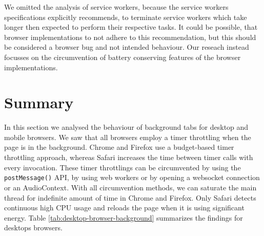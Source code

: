 \documentclass[
	ruledheaders=section,%
	class=report,%
	thesis={type=bachelor},%
	accentcolor=9c,%
	custommargins=true,%
	marginpar=false,%
	parskip=half-,%
	fontsize=11pt,%
]{tudapub}
\begin{document}
  We omitted the analysis of service workers, because the service workers specifications explicitly recommends, to terminate service workers which take longer then expected to perform their respective tasks. It could be possible, that browser implementations to not adhere to this recommendation, but this should be considered a browser bug and not intended behaviour. Our reseach instead focusses on the circumvention of battery conserving features of the browser implementations.


  
  \section{Summary}

  In this section we analysed the behaviour of background tabs for desktop and mobile browsers. We saw that all browsers employ a timer throttling when the page is in the background. Chrome and Firefox use a budget-based timer throttling approach, whereas Safari increases the time between timer calls with every invocation. These timer throttlings can be circumvented by using the \texttt{postMessage()} API, by using web workers or by opening a websocket connection or an AudioContext. With all circumvention methods, we can saturate the main thread for indefinite amount of time in Chrome and Firefox. Only Safari detects continuous high CPU usage and reloads the page when it is using significant energy. Table \ref{tab:desktop-browser-background} summarizes the findings for desktops browsers.
\end{document}
